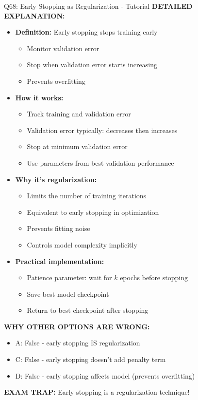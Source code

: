 \documentclass[8pt]{beamer}
\begin{document}
\begin{frame}{Q68: Early Stopping as Regularization - Tutorial}
		\vspace{0.05cm}
		\textbf{DETAILED EXPLANATION:}
		\begin{itemize}
			\item \textbf{Definition:} Early stopping stops training early
			\begin{itemize}
				\item Monitor validation error
				\item Stop when validation error starts increasing
				\item Prevents overfitting
			\end{itemize}
			\item \textbf{How it works:}
			\begin{itemize}
				\item Track training and validation error
				\item Validation error typically: decreases then increases
				\item Stop at minimum validation error
				\item Use parameters from best validation performance
			\end{itemize}
			\item \textbf{Why it's regularization:}
			\begin{itemize}
				\item Limits the number of training iterations
				\item Equivalent to early stopping in optimization
				\item Prevents fitting noise
				\item Controls model complexity implicitly
			\end{itemize}
			\item \textbf{Practical implementation:}
			\begin{itemize}
				\item Patience parameter: wait for $k$ epochs before stopping
				\item Save best model checkpoint
				\item Return to best checkpoint after stopping
			\end{itemize}
		\end{itemize}
		
		\vspace{0.05cm}
		\textcolor{myred}{\textbf{WHY OTHER OPTIONS ARE WRONG:}}
		\begin{itemize}
			\item \textcolor{myred}{A:} False - early stopping IS regularization
			\item \textcolor{myred}{C:} False - early stopping doesn't add penalty term
			\item \textcolor{myred}{D:} False - early stopping affects model (prevents overfitting)
		\end{itemize}
		
		\textcolor{myred}{\textbf{EXAM TRAP:}} Early stopping is a regularization technique!
	\end{frame}
	
\end{document}
